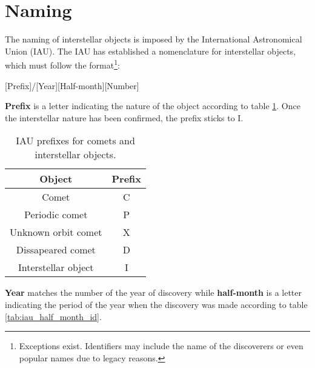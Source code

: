 \section{Naming}

The naming of interstellar objects is imposed by the International Astronomical
Union (IAU). The IAU has established a nomenclature for interstellar objects,
which must follow the format\footnote{Exceptions exist. Identifiers may include
the name of the discoverers or even popular names due to legacy reasons.}:

\begin{center}
    [Prefix]/[Year][Half-month][Number]
\end{center}

\textbf{Prefix} is a letter indicating the nature of the object according to
table \ref{tab:iau_prefixes}. Once the interstellar nature has been confirmed,
the prefix sticks to I.

\begin{table}[H]
    \centering
    \begin{tabular}{|c|c|}
        \hline
        \textbf{Object} & \textbf{Prefix} \\
        \hline
        Comet & C \\
        Periodic comet & P \\
        Unknown orbit comet & X \\
        Dissapeared comet & D \\
        Interstellar object & I \\
        \hline
    \end{tabular}
    \caption{IAU prefixes for comets and interstellar objects.}
    \label{tab:iau_prefixes}
\end{table}

\textbf{Year} matches the number of the year of discovery while
\textbf{half-month} is a letter indicating the period of the year when the
discovery was made according to table \ref{tab:iau_half_month_id}.

